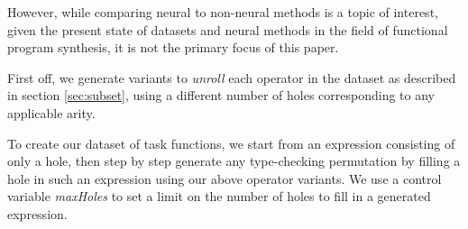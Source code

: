 \documentclass{article}
\begin{document}
However, while comparing neural to non-neural methods is a topic of interest,
given the present state of datasets and neural methods in the field of functional program synthesis,
it is not the primary focus of this paper.



First off, we generate variants to \emph{unroll} each operator in the dataset
as described in section \ref{sec:subset},
using a different number of holes corresponding to any applicable arity.


To create our dataset of task functions,
we start from an expression consisting of only a hole,
then step by step generate any type-checking permutation
by filling a hole in such an expression using our above operator variants.
We use a control variable \emph{maxHoles} to set a limit on
the number of holes to fill in a generated expression.
\end{document}

